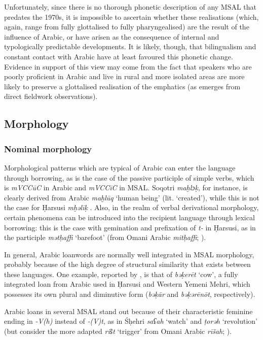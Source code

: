 \documentclass[output=paper]{langsci/langscibook}
\begin{document}
Unfortunately, since there is no thorough phonetic description of any MSAL that predates the 1970s, it is impossible to ascertain whether these realisations (which, again, range from fully glottalised to fully pharyngealised) are the result of the influence of Arabic, or have arisen as the consequence of internal and typologically predictable developments. It is likely, though, that bilingualism and constant contact with Arabic have at least favoured this phonetic change. Evidence in support of this view may come from the fact that speakers who are poorly proficient in Arabic and live in rural and more isolated areas are more likely to preserve a glottalised realisation of the emphatics (as emerges from direct fieldwork observations).


 
 \subsection{Morphology} 
 \subsubsection{Nominal morphology}\label{sec:key:nomorph}

Morphological patterns which are typical of Arabic can enter the language through borrowing, as is the case of the passive participle of simple verbs, which is \textit{mVCCūC} in Arabic and \textit{mVCCīC} in MSAL. Soqotri \textit{maḫlɔḳ}, for instance, is clearly derived from Arabic \textit{maḫlūq} ‘human being’ (lit. ‘created’), while this is not the case for Ḥarsusi \textit{mḫəlīḳ} \citep[299]{Lonnet2011}. Also, in the realm of verbal derivational morphology, certain phenomena can be introduced into the recipient language through lexical borrowing: this is the case with gemination and prefixation of \textit{t-} in Ḥarsusi, as in the participle \textit{mətḥaffi} ‘barefoot’ (from Omani Arabic \textit{mitḥaffi}; \citealt{Lonnet2011}).

In general, Arabic loanwords are normally well integrated in MSAL morphology, probably because of the high degree of structural similarity that exists between these languages. One example, reported by \citet{Lonnet2011}, is that of \textit{bəḳerēt} ‘cow’, a fully integrated loan from Arabic used in Ḥarsusi and Western Yemeni Mehri, which possesses its own plural and diminutive form (\textit{bəḳār} and \textit{bəḳərēnōt}, respectively).

Arabic loans in several MSAL stand out because of their characteristic feminine ending in \textit{-V(h)} instead of \textit{-(V)t}, as in Śḥehri \textit{saʕah} ‘watch’ and \textit{ṭorəh} ‘revolution’ (but consider the more adapted \textit{ris͂t} ‘trigger’ from Omani Arabic \textit{rīšah}; \citealt{Lonnet2011}). 
\end{document}
